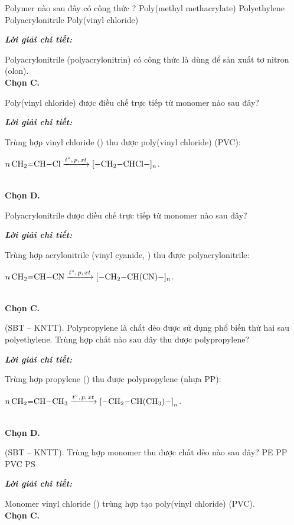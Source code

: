 \documentclass[11pt,a4paper]{article}
\def\loigiai#1{
\par\begingroup\color{blue!80!black}\small
\noindent\textbf{\textit{Lời giải chi tiết:}}\par
#1\par\endgroup}
\begin{document}
\begin{ex}
Polymer nào sau đây có công thức ?
\choice
{Poly(methyl methacrylate)}
{Polyethylene}
{\True Polyacrylonitrile}
{Poly(vinyl chloride)}
\loigiai{
Polyacrylonitrile (polyacrylonitrin) có công thức là \ce{[-CH2-CH(CN)-]_n} dùng để sản xuất tơ nitron (olon).\\
\textbf{Chọn C.}}
\end{ex}

\begin{ex}
Poly(vinyl chloride) được điều chế trực tiếp từ monomer nào sau đây?
\choice
{}
{}
{}
{\True {}}
\loigiai{
Trùng hợp vinyl chloride (\ce{CH2=CH-Cl}) thu được poly(vinyl chloride) (PVC):\\
\centerline{$n\,\ce{CH2=CH-Cl} \xrightarrow{t^\circ,\, p,\, xt} \ce{[-CH2-CHCl-]_n}$.}\\
\textbf{Chọn D.}}
\end{ex}

\begin{ex}
Polyacrylonitrile được điều chế trực tiếp từ monomer nào sau đây?
\choice
{}
{}
{\True {}}
{}
\loigiai{
Trùng hợp acrylonitrile (vinyl cyanide, \ce{CH2=CH-CN}) thu được polyacrylonitrile:\\
\centerline{$n\,\ce{CH2=CH-CN} \xrightarrow{t^\circ,\, p,\, xt} \ce{[-CH2-CH(CN)-]_n}$.}\\
\textbf{Chọn C.}}
\end{ex}

\begin{ex}
(SBT -- KNTT). Polypropylene là chất dẻo được sử dụng phổ biến thứ hai sau polyethylene. Trùng hợp chất nào sau đây thu được polypropylene?
\choice
{}
{}
{}
{\True {}}
\loigiai{
Trùng hợp propylene (\ce{CH2=CH-CH3}) thu được polypropylene (nhựa PP):\\
\centerline{$n\,\ce{CH2=CH-CH3} \xrightarrow{t^\circ,\, p,\, xt} \ce{[-CH2-CH(CH3)-]}_n$.}\\
\textbf{Chọn D.}}
\end{ex}

\begin{ex}
(SBT -- KNTT). Trùng hợp monomer  thu được chất dẻo nào sau đây?
\choice
{PE}
{PP}
{\True PVC}
{PS}
\loigiai{
Monomer vinyl chloride () trùng hợp tạo poly(vinyl chloride) (PVC).\\
\textbf{Chọn C.}}
\end{ex}
\end{document}
